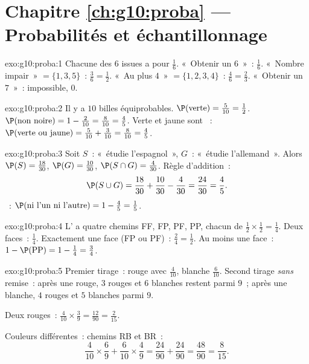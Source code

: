 \section*{Chapitre \ref{ch:g10:proba} --- Probabilités et échantillonnage}

\begin{solution}{exo:g10:proba:1}
Chacune des $6$ issues a pour  $\frac16$.
«~Obtenir un $6$~»~: $\frac16$.
«~Nombre impair~» $= \{1, 3, 5\}$~: $\frac36 = \frac12$.
«~Au plus $4$~» $= \{1,2,3,4\}$~: $\frac46 = \frac23$.
«~Obtenir un $7$~»~:  impossible,  $0$.
\end{solution}

\begin{solution}{exo:g10:proba:2}
Il y a $10$ billes équiprobables.
$\P(\text{verte}) = \frac{5}{10} = \frac12$.
$\P(\text{non noire}) = 1 - \frac{2}{10} = \frac{8}{10} = \frac45$.
Verte et jaune sont ~:
$\P(\text{verte ou jaune}) = \frac{5}{10} + \frac{3}{10} = \frac{8}{10}
= \frac45$.
\end{solution}

\begin{solution}{exo:g10:proba:3}
Soit $S$~: «~étudie l'espagnol~», $G$~: «~étudie l'allemand~». Alors
$\P(S) = \frac{18}{30}$, $\P(G) = \frac{10}{30}$,
$\P(S \cap G) = \frac{4}{30}$. Règle d'addition~:
\[
\P(S \cup G) = \frac{18}{30} + \frac{10}{30} - \frac{4}{30}
= \frac{24}{30} = \frac45 .
\]
~: $\P(\text{ni l'un ni l'autre}) = 1 - \frac45 =
\frac15$.
\end{solution}

\begin{solution}{exo:g10:proba:4}
L' a quatre chemins FF, FP, PF, PP, chacun de 
$\frac12 \times \frac12 = \frac14$.
Deux faces~: $\frac14$. Exactement une face (FP ou PF)~:
$\frac24 = \frac12$.
Au moins une face~: $1 - \P(\text{PP}) = 1 - \frac14 = \frac34$.
\end{solution}

\begin{solution}{exo:g10:proba:5}
Premier tirage~: rouge avec  $\frac{4}{10}$, blanche
$\frac{6}{10}$.
Second tirage \emph{sans} remise~: après une rouge, $3$ rouges et $6$
blanches restent parmi $9$~; après une blanche, $4$ rouges et $5$
blanches parmi $9$.

Deux rouges~: $\frac{4}{10} \times \frac39 = \frac{12}{90} =
\frac{2}{15}$.

Couleurs différentes~: chemins RB et BR~:
\[
\frac{4}{10} \times \frac69 + \frac{6}{10} \times \frac49
= \frac{24}{90} + \frac{24}{90} = \frac{48}{90} = \frac{8}{15}.
\]
\end{solution}

